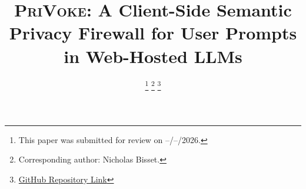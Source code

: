 \documentclass[conference]{IEEEtran}
\newcommand{\privoke}{\textsc{PriVoke}\xspace}
\begin{document}
\title{\privoke: A Client-Side Semantic Privacy Firewall for User Prompts in Web-Hosted LLMs}

\author{
\and
{}

\thanks{This paper was submitted for review on --/--/2026.}
\thanks{Corresponding author: Nicholas Bisset.}
\thanks{\href{https://github.com/Densetsu152637/Privoke-Research-Project}{GitHub Repository Link}}
}
\end{document}
